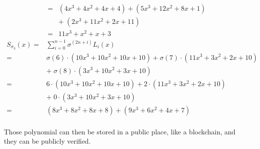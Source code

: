 \begin{example}
$$\begin{array}{rl}
         = & (4x^3 + 4 x^2 +4x + 4) 
           + (5x^3 +12x^2 +8x + 1) \\
           & +\;(2x^3 +11x^2+ 2x + 11)\\  
         = & 11x^3 + x^2 +x + 3                                        
\end{array}
$$
$$
\begin{array}{rl}
S_{\sigma_3}(x) = & \sum_{i=0}^{n-1} \sigma^(2n+i)L_i(x) \\       
         = & \sigma(6) \cdot (10x^3 + 10 x^2 +10x + 10) 
           + \sigma(7)\cdot (11x^3 +3x^2 +2x + 10) \\
           & +\; \sigma(8)\cdot (3x^3 +10x^2+ 3x + 10)\\  
         = & 6 \cdot (10x^3 + 10 x^2 +10x + 10) 
           + 2\cdot (11x^3 +3x^2 +2x + 10) \\
           & +\; 0\cdot (3x^3 +10x^2+ 3x + 10)\\                                               
         = & (8x^3 + 8 x^2 +8x + 8) 
           + (9x^3 +6x^2 +4x + 7) \\
\end{array}
$$

Those polynomial can then be stored in a public place, like a blockchain, and they can be publicly verified.
\end{example}










